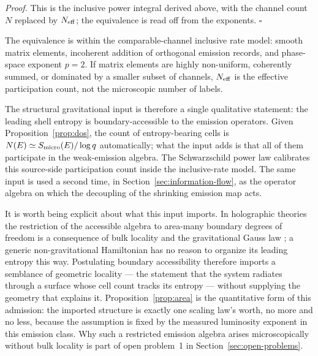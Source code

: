 \documentclass[12pt]{article}
\newcommand{\Smicro}{S_{\rm micro}}
\begin{document}
\emph{Proof.}  This is the inclusive power integral derived above, with the
channel count $N$ replaced by $N_{\rm eff}$; the equivalence is read off from
the exponents.  \hfill$\square$

The equivalence is within the comparable-channel inclusive rate model:
smooth matrix elements, incoherent addition of orthogonal emission records,
and phase-space exponent $p=2$.  If matrix elements are highly non-uniform,
coherently summed, or dominated by a smaller subset of channels,
$N_{\rm eff}$ is the effective participation count, not the microscopic
number of labels.

The structural gravitational input is therefore a single qualitative
statement: the leading shell entropy is boundary-accessible to the emission
operators.  Given Proposition~\ref{prop:dos}, the count of entropy-bearing
cells is $N(E)\simeq\Smicro(E)/\log q$ automatically; what the input adds is
that all of them participate in the weak-emission algebra.  The Schwarzschild
power law calibrates this source-side participation count inside the
inclusive-rate model.  The same input is used a second time, in
Section~\ref{sec:information-flow}, as the operator algebra on which the
decoupling of the shrinking emission map acts.

It is worth being explicit about what this input imports.  In holographic
theories the restriction of the accessible algebra to area-many boundary
degrees of freedom is a consequence of bulk locality and the gravitational
Gauss law \cite{Harlow2016}; a generic non-gravitational Hamiltonian has no
reason to organize its leading entropy this way.  Postulating boundary
accessibility therefore imports a semblance of geometric locality --- the
statement that the system radiates through a surface whose cell count tracks
its entropy --- without supplying the geometry that explains it.
Proposition~\ref{prop:area} is the quantitative form of this admission: the
imported structure is exactly one scaling law's worth, no more and no less,
because the assumption is fixed by the measured luminosity exponent in this
emission class.
Why such a restricted emission algebra arises microscopically without bulk
locality is part of open problem~1 in Section~\ref{sec:open-problems}.
\end{document}
